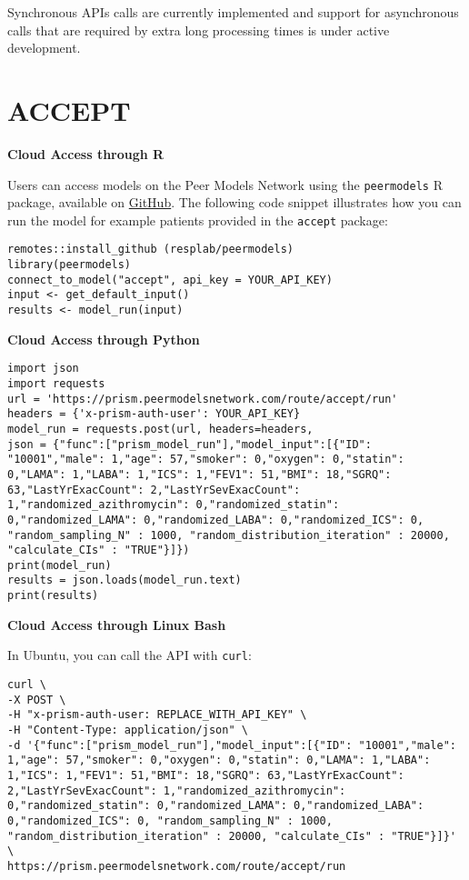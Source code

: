 \documentclass[
]{book}
\begin{document}
Synchronous APIs calls are currently implemented and support for asynchronous calls that are required by extra long processing times is under active development.

\hypertarget{accept-1}{%
\section{ACCEPT}\label{accept-1}}

\textbf{Cloud Access through R}

Users can access models on the Peer Models Network using the \texttt{peermodels} R package, available on \href{https://github.com/resplab/peermodels}{GitHub}. The following code snippet illustrates how you can run the model for example patients provided in the \texttt{accept} package:

\begin{verbatim}
remotes::install_github (resplab/peermodels)
library(peermodels)
connect_to_model("accept", api_key = YOUR_API_KEY)
input <- get_default_input()
results <- model_run(input)
\end{verbatim}

\textbf{Cloud Access through Python}

\begin{verbatim}
import json
import requests
url = 'https://prism.peermodelsnetwork.com/route/accept/run'
headers = {'x-prism-auth-user': YOUR_API_KEY}
model_run = requests.post(url, headers=headers,
json = {"func":["prism_model_run"],"model_input":[{"ID": "10001","male": 1,"age": 57,"smoker": 0,"oxygen": 0,"statin": 0,"LAMA": 1,"LABA": 1,"ICS": 1,"FEV1": 51,"BMI": 18,"SGRQ": 63,"LastYrExacCount": 2,"LastYrSevExacCount": 1,"randomized_azithromycin": 0,"randomized_statin": 0,"randomized_LAMA": 0,"randomized_LABA": 0,"randomized_ICS": 0, "random_sampling_N" : 1000, "random_distribution_iteration" : 20000, "calculate_CIs" : "TRUE"}]})
print(model_run)
results = json.loads(model_run.text)
print(results)
\end{verbatim}

\textbf{Cloud Access through Linux Bash}

In Ubuntu, you can call the API with \texttt{curl}:

\begin{verbatim}
curl \
-X POST \
-H "x-prism-auth-user: REPLACE_WITH_API_KEY" \
-H "Content-Type: application/json" \
-d '{"func":["prism_model_run"],"model_input":[{"ID": "10001","male": 1,"age": 57,"smoker": 0,"oxygen": 0,"statin": 0,"LAMA": 1,"LABA": 1,"ICS": 1,"FEV1": 51,"BMI": 18,"SGRQ": 63,"LastYrExacCount": 2,"LastYrSevExacCount": 1,"randomized_azithromycin": 0,"randomized_statin": 0,"randomized_LAMA": 0,"randomized_LABA": 0,"randomized_ICS": 0, "random_sampling_N" : 1000, "random_distribution_iteration" : 20000, "calculate_CIs" : "TRUE"}]}' \
https://prism.peermodelsnetwork.com/route/accept/run
\end{verbatim}
\end{document}
